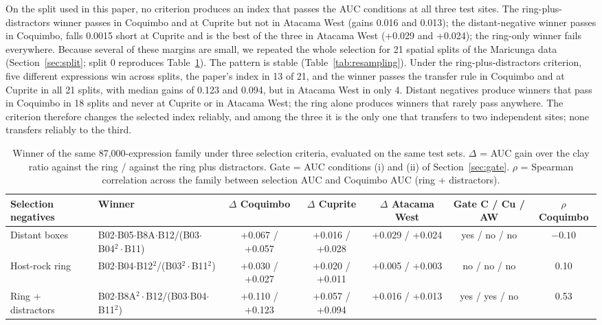 \documentclass[pdflatex,sn-basic]{sn-jnl}
\begin{document}
On the split used in this paper, no criterion produces an index that passes the AUC conditions at all three test sites. The ring-plus-distractors winner passes in Coquimbo and at Cuprite but not in Atacama West (gains 0.016 and 0.013); the distant-negative winner passes in Coquimbo, falls 0.0015 short at Cuprite and is the best of the three in Atacama West (+0.029 and +0.024); the ring-only winner fails everywhere. Because several of these margins are small, we repeated the whole selection for 21 spatial splits of the Maricunga data (Section~\ref{sec:split}; split 0 reproduces Table~\ref{tab:criteria}). The pattern is stable (Table~\ref{tab:resampling}). Under the ring-plus-distractors criterion, five different expressions win across splits, the paper's index in 13 of 21, and the winner passes the transfer rule in Coquimbo and at Cuprite in all 21 splits, with median gains of 0.123 and 0.094, but in Atacama West in only 4. Distant negatives produce winners that pass in Coquimbo in 18 splits and never at Cuprite or in Atacama West; the ring alone produces winners that rarely pass anywhere. The criterion therefore changes the selected index reliably, and among the three it is the only one that transfers to two independent sites; none transfers reliably to the third.

\begin{table}
\centering
\caption{Winner of the same 87{,}000-expression family under three selection criteria, evaluated on the same test sets. $\Delta$ = AUC gain over the clay ratio against the ring / against the ring plus distractors. Gate = AUC conditions (i) and (ii) of Section~\ref{sec:gate}. $\rho$ = Spearman correlation across the family between selection AUC and Coquimbo AUC (ring + distractors).}
\label{tab:criteria}
\footnotesize\setlength{\tabcolsep}{3pt}
\begin{tabular}{llccccc}
\toprule
Selection negatives & Winner & $\Delta$ Coquimbo & $\Delta$ Cuprite & $\Delta$ Atacama West & Gate C / Cu / AW & $\rho$ Coquimbo \\
\midrule
Distant boxes & B02$\cdot$B05$\cdot$B8A$\cdot$B12/(B03$\cdot$B04$^2\cdot$B11) & +0.067 / +0.057 & +0.016 / +0.028 & +0.029 / +0.024 & yes / no / no & $-0.10$ \\
Host-rock ring & B02$\cdot$B04$\cdot$B12$^2$/(B03$^2\cdot$B11$^2$) & +0.030 / +0.027 & +0.020 / +0.011 & +0.005 / +0.003 & no / no / no & 0.10 \\
Ring + distractors & B02$\cdot$B8A$^2\cdot$B12/(B03$\cdot$B04$\cdot$B11$^2$) & +0.110 / +0.123 & +0.057 / +0.094 & +0.016 / +0.013 & yes / yes / no & 0.53 \\
\bottomrule
\end{tabular}
\end{table}
\end{document}
